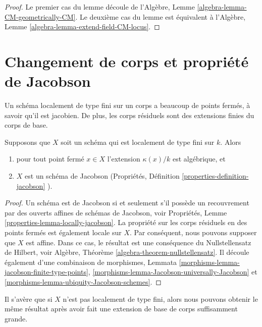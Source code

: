 \begin{proof}
Le premier cas du lemme découle de l'Algèbre,
Lemme \ref{algebra-lemma-CM-geometrically-CM}. Le
deuxième cas du lemme est équivalent à l'Algèbre,
Lemme \ref{algebra-lemma-extend-field-CM-locus}.
\end{proof}







\section{Changement de corps et propriété de Jacobson}
\label{section-overfield}

\noindent
Un schéma localement de type fini sur un corps a beaucoup
de points fermés, à savoir qu'il est jacobien. De plus, les
corps résiduels sont des extensions finies du corps de base.

\begin{lemma}
\label{lemma-locally-finite-type-Jacobson}
Supposons que $X$ soit un schéma qui est
localement de type fini sur $k$. Alors
\begin{enumerate}
\item pour tout point fermé $x \in X$
l'extension $\kappa(x)/k$ est algébrique, et
\item $X$ est un schéma de Jacobson (Propriétés,
Définition \ref{properties-definition-jacobson} ).
\end{enumerate}
\end{lemma}

\begin{proof}
Un schéma est de Jacobson si et seulement s'il possède un
recouvrement par des ouverts affines de schémas de Jacobson,
voir Propriétés, Lemme
\ref{properties-lemma-locally-jacobson}. La propriété sur les corps
résiduels en des points fermés est également locale sur $X$. Par
conséquent, nous pouvons supposer que $X$ est affine. Dans ce cas,
le résultat est une conséquence du Nullstellensatz de Hilbert, voir
Algèbre, Théorème \ref{algebra-theorem-nullstellensatz}. Il découle
également d'une combinaison de morphismes, Lemmata
\ref{morphisms-lemma-jacobson-finite-type-points},
\ref{morphisms-lemma-Jacobson-universally-Jacobson} et \ref{morphisms-lemma-ubiquity-Jacobson-schemes}.
\end{proof}

\noindent
Il s'avère que si $X$ n'est pas localement de type fini, alors nous pouvons obtenir
le même résultat après avoir fait une extension de base de corps suffisamment grande.


